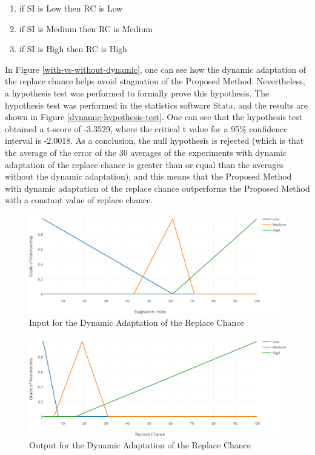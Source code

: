 \documentclass[12pt,journal,draftcls,onecolumn]{IEEEtran}
\begin{document}
\begin{enumerate}
\item if SI is Low then RC is Low
\item if SI is Medium then RC is Medium
\item if SI is High then RC is High
\end{enumerate}

In Figure \ref{with-vs-without-dynamic}, one can see how the dynamic
adaptation of the replace chance helps avoid stagnation of the
Proposed Method. Nevertheless, a hypothesis test was performed to
formally prove this hypothesis. The hypothesis test was performed in
the statistics software Stata, and the results are shown in Figure
\ref{dynamic-hypothesis-test}. One can see that the hypothesis test
obtained a t-score of -3.3529, where the critical t value for a 95\%
confidence interval is -2.0018. As a conclusion, the null hypothesis
is rejected (which is that the average of the error of the 30 averages
of the experiments with dynamic adaptation of the replace chance is
greater than or equal than the averages without the dynamic
adaptation), and this means that the Proposed Method with dynamic
adaptation of the replace chance outperforms the Proposed Method with
a constant value of replace chance.

\begin{figure}[h!]
\caption{Input for the Dynamic Adaptation of the Replace Chance}
\label{dynamic-adaptation-input}
\begin{center}
\includegraphics[width=1\columnwidth]{figures/stagnation-input/stagnation-input.png}
\end{center}
\end{figure}

\begin{figure}[h!]
\caption{Output for the Dynamic Adaptation of the Replace Chance}
\label{dynamic-adaptation-output}
\begin{center}
\includegraphics[width=1\columnwidth]{figures/stagnation-output/stagnation-output.png}
\end{center}
\end{figure}
\end{document}
